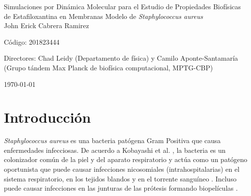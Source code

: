 \documentclass[12pt]{article}
\begin{document}
\begin{center}
\LARGE
Simulaciones por Din\'{a}mica Molecular para el Estudio de Propiedades Biof\'{i}sicas de Estafiloxantina en Membranas Modelo de \textit{Staphylococcus aureus}\\
\vspace{3mm}
\large
John Erick Cabrera Ramirez 

 C\'odigo: 201823444


\vspace{2mm}
\large
Directores: Chad Leidy (Departamento
de física) y Camilo Aponte-Santamaría (Grupo tándem Max Planck de biofísica computacional, MPTG-CBP)

\normalsize
\vspace{2mm}

\today
\end{center}


\normalsize
\tableofcontents
\newpage
\begin{abstract}

\end{abstract}
\newpage
\section{Introducci\'on}

\textit{Staphylococcus aureus} es una bacteria pat\'{o}gena Gram Positiva que causa enfermedades infecciosas. De acuerdo a Kobayashi et al. \cite{Kobayashi2015PathogenesisAbscesses}, la bacteria es un colonizador común de la piel y del aparato respiratorio y actúa como un patógeno oportunista que puede causar infecciones nicosomiales (intrahospitalarias) en el sistema respiratorio, en los tejidos blandos y en el torrente sangu\'ineo \cite{HarpavatS.NissimS.LipppincottsMicrocards:MicrobiologyFlashCards2012.}. Incluso puede causar infecciones en las junturas de las pr\'otesis formando biopel\'iculas \cite{Meylan2018}.\\


\end{document}
